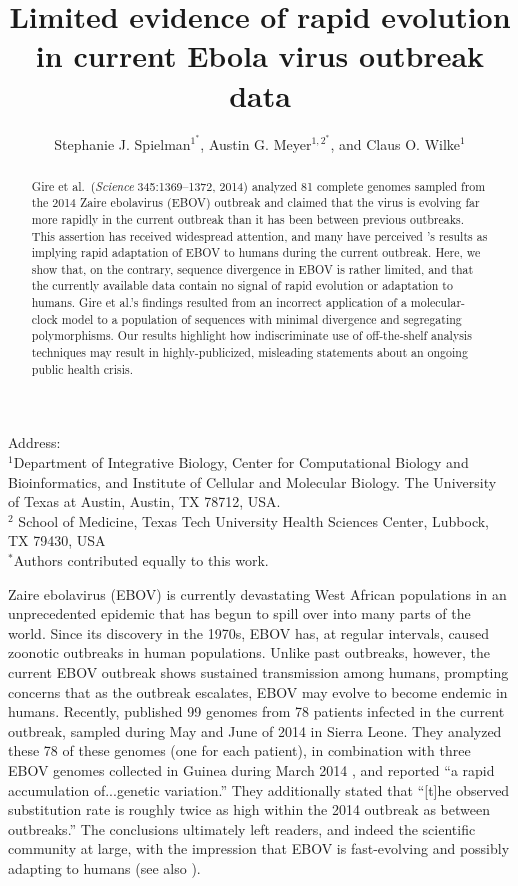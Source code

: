 \documentclass[11pt]{article}
\title{Limited evidence of rapid evolution in current Ebola virus outbreak data}
\author{Stephanie J. Spielman$^{1^\ast}$, Austin G. Meyer$^{1,2^\ast}$, and Claus O. Wilke$^{1}$}
\begin{document}
\maketitle
\maketitle
\noindent
Address:\\
$^1$Department of Integrative Biology, Center for Computational Biology and Bioinformatics, and Institute of Cellular and Molecular Biology.
The University of Texas at Austin, Austin, TX 78712, USA.\\
$^2$ School of Medicine, Texas Tech University Health Sciences Center, Lubbock, TX 79430, USA \\
$^\ast$Authors contributed equally to this work.


\begin{abstract}
{\color{blue}Gire et al.\ (\emph{Science} 345:1369--1372, 2014) analyzed 81 complete genomes sampled from the 2014 Zaire ebolavirus (EBOV) outbreak and claimed that the virus is evolving far more rapidly in the current outbreak than it has been between previous outbreaks. This assertion has received widespread attention, and many have perceived \citet{Gire2014}'s results as implying rapid adaptation of EBOV to humans during the current outbreak. Here, we show that, on the contrary, sequence divergence in EBOV is rather limited, and that the currently available data contain no signal of rapid evolution or adaptation to humans. Gire et al.'s findings resulted from an incorrect application of a molecular-clock model to a population of sequences with minimal divergence and segregating polymorphisms. Our results highlight how indiscriminate use of off-the-shelf analysis techniques may result in highly-publicized, misleading statements about an ongoing public health crisis.}
\end{abstract}

\noindent
Zaire ebolavirus (EBOV) is currently devastating West African populations in an unprecedented epidemic that has begun to spill over into many parts of the world. Since its discovery in the 1970s, EBOV has, at regular intervals, caused zoonotic outbreaks in human populations. Unlike past outbreaks, however, the current EBOV outbreak shows sustained transmission among humans, prompting concerns that as the outbreak escalates, EBOV may evolve to become endemic in humans. Recently, \citet{Gire2014} published 99 genomes from 78 patients infected in the current outbreak, sampled during May and June of 2014 in Sierra Leone. They analyzed these 78 of these genomes (one for each patient), in combination with three EBOV genomes collected in Guinea during March 2014 \citep{Baizeetal2014}, and reported ``a rapid accumulation of...genetic variation.'' They additionally stated that ``[t]he observed substitution rate is roughly twice as high within the 2014 outbreak as between outbreaks.'' The conclusions ultimately left readers, and indeed the scientific community at large, with the impression that EBOV is fast-evolving and possibly adapting to humans (see also \citealt{NatureEditorial,Lukszaetal2014,Alexanderetal2014}). 
\end{document}
